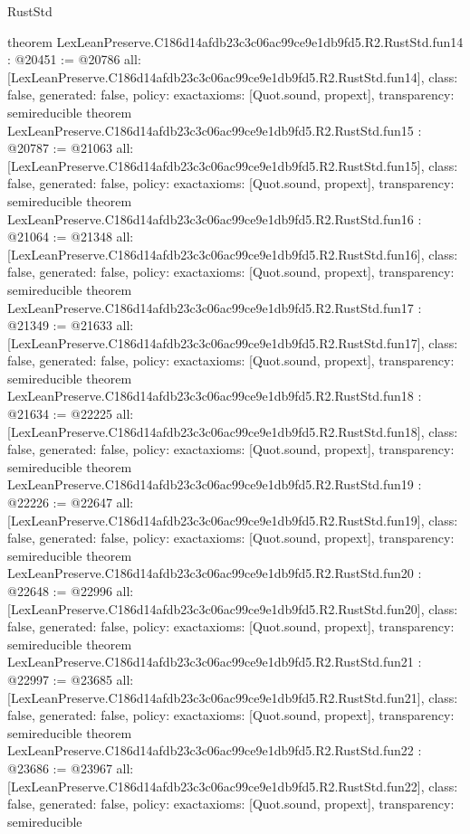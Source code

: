 \begin{lexlean}{RustStd}
\begin{coremodule}
{}
theorem LexLeanPreserve.C186d14afdb23c3c06ac99ce9e1db9fd5.R2.RustStd.fun14 : @20451 := @20786 {
  all: [LexLeanPreserve.C186d14afdb23c3c06ac99ce9e1db9fd5.R2.RustStd.fun14],
  class: false,
  generated: false,
  policy: exact{axioms: [Quot.sound, propext]},
  transparency: semireducible
}
theorem LexLeanPreserve.C186d14afdb23c3c06ac99ce9e1db9fd5.R2.RustStd.fun15 : @20787 := @21063 {
  all: [LexLeanPreserve.C186d14afdb23c3c06ac99ce9e1db9fd5.R2.RustStd.fun15],
  class: false,
  generated: false,
  policy: exact{axioms: [Quot.sound, propext]},
  transparency: semireducible
}
theorem LexLeanPreserve.C186d14afdb23c3c06ac99ce9e1db9fd5.R2.RustStd.fun16 : @21064 := @21348 {
  all: [LexLeanPreserve.C186d14afdb23c3c06ac99ce9e1db9fd5.R2.RustStd.fun16],
  class: false,
  generated: false,
  policy: exact{axioms: [Quot.sound, propext]},
  transparency: semireducible
}
theorem LexLeanPreserve.C186d14afdb23c3c06ac99ce9e1db9fd5.R2.RustStd.fun17 : @21349 := @21633 {
  all: [LexLeanPreserve.C186d14afdb23c3c06ac99ce9e1db9fd5.R2.RustStd.fun17],
  class: false,
  generated: false,
  policy: exact{axioms: [Quot.sound, propext]},
  transparency: semireducible
}
theorem LexLeanPreserve.C186d14afdb23c3c06ac99ce9e1db9fd5.R2.RustStd.fun18 : @21634 := @22225 {
  all: [LexLeanPreserve.C186d14afdb23c3c06ac99ce9e1db9fd5.R2.RustStd.fun18],
  class: false,
  generated: false,
  policy: exact{axioms: [Quot.sound, propext]},
  transparency: semireducible
}
theorem LexLeanPreserve.C186d14afdb23c3c06ac99ce9e1db9fd5.R2.RustStd.fun19 : @22226 := @22647 {
  all: [LexLeanPreserve.C186d14afdb23c3c06ac99ce9e1db9fd5.R2.RustStd.fun19],
  class: false,
  generated: false,
  policy: exact{axioms: [Quot.sound, propext]},
  transparency: semireducible
}
theorem LexLeanPreserve.C186d14afdb23c3c06ac99ce9e1db9fd5.R2.RustStd.fun20 : @22648 := @22996 {
  all: [LexLeanPreserve.C186d14afdb23c3c06ac99ce9e1db9fd5.R2.RustStd.fun20],
  class: false,
  generated: false,
  policy: exact{axioms: [Quot.sound, propext]},
  transparency: semireducible
}
theorem LexLeanPreserve.C186d14afdb23c3c06ac99ce9e1db9fd5.R2.RustStd.fun21 : @22997 := @23685 {
  all: [LexLeanPreserve.C186d14afdb23c3c06ac99ce9e1db9fd5.R2.RustStd.fun21],
  class: false,
  generated: false,
  policy: exact{axioms: [Quot.sound, propext]},
  transparency: semireducible
}
theorem LexLeanPreserve.C186d14afdb23c3c06ac99ce9e1db9fd5.R2.RustStd.fun22 : @23686 := @23967 {
  all: [LexLeanPreserve.C186d14afdb23c3c06ac99ce9e1db9fd5.R2.RustStd.fun22],
  class: false,
  generated: false,
  policy: exact{axioms: [Quot.sound, propext]},
  transparency: semireducible
}
\end{coremodule}
\end{lexlean}
